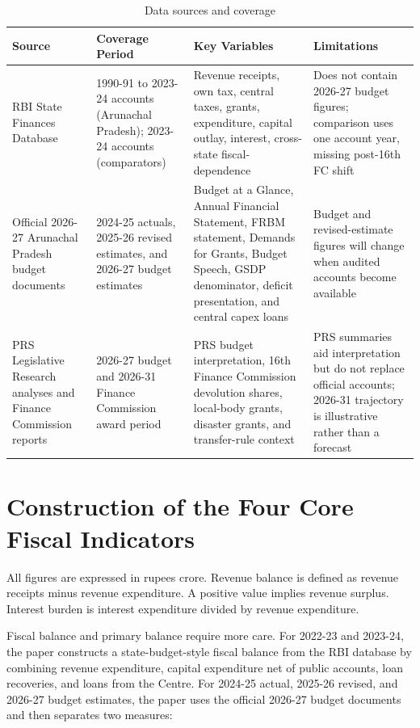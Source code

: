 \documentclass[11pt,a4paper]{article}
\begin{document}
\begin{table}[H]
\centering
\caption{Data sources and coverage}
\small
\begin{tabular}{L{3.3cm}L{2.6cm}L{4.2cm}L{4.0cm}}
\toprule
Source & Coverage Period & Key Variables & Limitations \\
\midrule
RBI State Finances Database & 1990-91 to 2023-24 accounts (Arunachal Pradesh); 2023-24 accounts (comparators) & Revenue receipts, own tax, central taxes, grants, expenditure, capital outlay, interest, cross-state fiscal-dependence & Does not contain 2026-27 budget figures; comparison uses one account year, missing post-16th FC shift \\
Official 2026-27 Arunachal Pradesh budget documents & 2024-25 actuals, 2025-26 revised estimates, and 2026-27 budget estimates & Budget at a Glance, Annual Financial Statement, FRBM statement, Demands for Grants, Budget Speech, GSDP denominator, deficit presentation, and central capex loans & Budget and revised-estimate figures will change when audited accounts become available \\
PRS Legislative Research analyses and Finance Commission reports & 2026-27 budget and 2026-31 Finance Commission award period & PRS budget interpretation, 16th Finance Commission devolution shares, local-body grants, disaster grants, and transfer-rule context & PRS summaries aid interpretation but do not replace official accounts; 2026-31 trajectory is illustrative rather than a forecast \\
\bottomrule
\end{tabular}
\end{table}

\section{Construction of the Four Core Fiscal Indicators}

All figures are expressed in rupees crore. Revenue balance is defined as revenue receipts minus revenue expenditure. A positive value implies revenue surplus. Interest burden is interest expenditure divided by revenue expenditure.

Fiscal balance and primary balance require more care. For 2022-23 and 2023-24, the paper constructs a state-budget-style fiscal balance from the RBI database by combining revenue expenditure, capital expenditure net of public accounts, loan recoveries, and loans from the Centre. For 2024-25 actual, 2025-26 revised, and 2026-27 budget estimates, the paper uses the official 2026-27 budget documents and then separates two measures:
\end{document}
